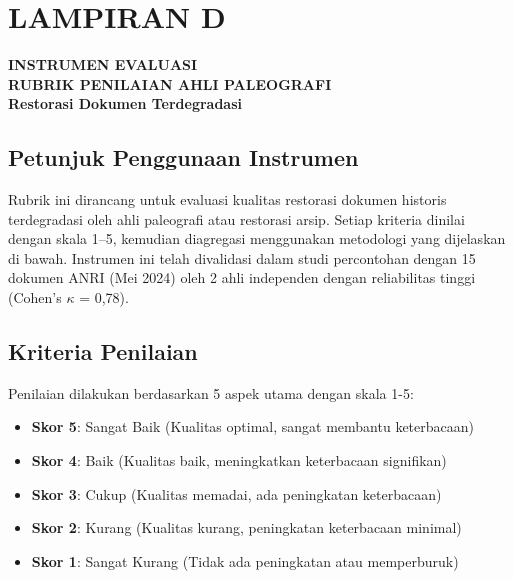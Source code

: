 \documentclass[12pt,a4paper]{article}
\begin{document}

\section*{LAMPIRAN D}

\vspace{1em}

\begin{center}
{\Large\textbf{INSTRUMEN EVALUASI}}\\[0.5em]
{\Large\textbf{RUBRIK PENILAIAN AHLI PALEOGRAFI}}\\[0.5em]
{\large\textbf{Restorasi Dokumen Terdegradasi}}
\end{center}

\vspace{2em}


\subsection*{Petunjuk Penggunaan Instrumen}

Rubrik ini dirancang untuk evaluasi kualitas restorasi dokumen historis terdegradasi oleh ahli paleografi atau restorasi arsip. Setiap kriteria dinilai dengan skala 1--5, kemudian diagregasi menggunakan metodologi yang dijelaskan di bawah. Instrumen ini telah divalidasi dalam studi percontohan dengan 15 dokumen ANRI (Mei 2024) oleh 2 ahli independen dengan reliabilitas tinggi (Cohen's $\kappa$ = 0,78).

\vspace{2em}


\subsection*{Kriteria Penilaian}

Penilaian dilakukan berdasarkan 5 aspek utama dengan skala 1-5:
\begin{itemize}[leftmargin=*, itemsep=0pt]
    \item \textbf{Skor 5}: Sangat Baik (Kualitas optimal, sangat membantu keterbacaan)
    \item \textbf{Skor 4}: Baik (Kualitas baik, meningkatkan keterbacaan signifikan)
    \item \textbf{Skor 3}: Cukup (Kualitas memadai, ada peningkatan keterbacaan)
    \item \textbf{Skor 2}: Kurang (Kualitas kurang, peningkatan keterbacaan minimal)
    \item \textbf{Skor 1}: Sangat Kurang (Tidak ada peningkatan atau memperburuk)
\end{itemize}
\newpage
\vspace{1em}
\end{document}
